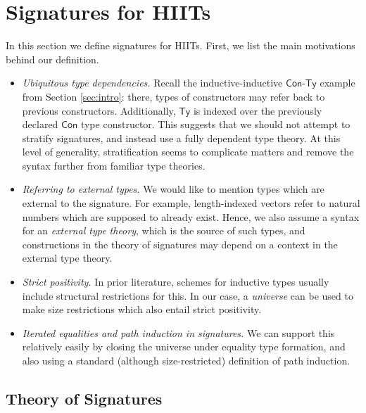 \documentclass[dvipsnames]{lmcs} %
\newcommand{\Con}{\mathsf{Con}}
\newcommand{\Ty}{\mathsf{Ty}}
\newcommand{\1}{\mathsf{1}} \renewcommand{\Pr}{\mathsf{Pr}}
\theoremstyle{plain}\newtheorem{satz}[thm]{Satz} %
\begin{document}
\section{Signatures for HIITs}
\label{sec:signatures}

In this section we define signatures for HIITs. First, we list
the main motivations behind our definition.

\begin{itemize}
\item\emph{Ubiquitous type dependencies.}
Recall the inductive-inductive $\Con$-$\Ty$ example from Section
\ref{sec:intro}: there, types of constructors may refer back to previous
constructors. Additionally, $\Ty$ is indexed over the previously declared $\Con$
type constructor. This suggests that we should not attempt to stratify
signatures, and instead use a fully dependent type theory. At this level of
generality, stratification seems to complicate matters and remove the syntax
further from familiar type theories.

\item\emph{Referring to external types.}
We would like to mention types which are external to the signature. For example,
length-indexed vectors refer to natural numbers which are supposed to already
exist. Hence, we also assume a syntax for an \emph{external type theory}, which
is the source of such types, and constructions in the theory of signatures may
depend on a context in the external type theory.

\item\emph{Strict positivity.}
In prior literature, schemes for inductive types usually include structural
restrictions for this. In our case, a \emph{universe} can be used to make
size restrictions which also entail strict positivity.

\item\emph{Iterated equalities and path induction in signatures.}
We can support this relatively easily by closing the universe under equality
type formation, and also using a standard (although size-restricted) definition
of path induction.
\end{itemize}


\subsection{Theory of Signatures}
\label{sec:tos}
\end{document}
